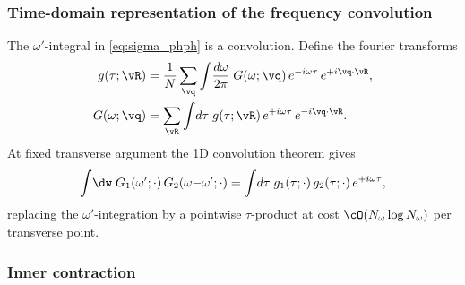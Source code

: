 \subsubsection{Time-domain representation of the frequency
  convolution}
\label{ssub:time_domain}

The $\omega'$-integral in \cref{eq:sigma_phph} is a convolution.
Define the fourier transforms
\begin{align}
  g(\tau;\vR) &= \frac{1}{N}\sum_{\vq}\int\!\frac{d\omega}{2\pi}\;
                  G(\omega;\vq)\,e^{-i\omega\tau}\,e^{+i\vq\cdot\vR},
  \label{eq:g_2d}\\
  G(\omega;\vq) &= \sum_{\vR}\int\!d\tau\;
                  g(\tau;\vR)\,e^{+i\omega\tau}\,e^{-i\vq\cdot\vR}.
  \label{eq:G_2d}
\end{align}
At fixed transverse argument the 1D convolution theorem gives
\begin{equation}
  \int\!\dw\; G_1(\omega';\cdot)\,G_2(\omega{-}\omega';\cdot)
  = \int\!d\tau\; g_1(\tau;\cdot)\,g_2(\tau;\cdot)\,
    e^{+i\omega\tau},
  \label{eq:omega_conv}
\end{equation}
replacing the $\omega'$-integration by a pointwise $\tau$-product
at cost $\cO(N_\omega\log N_\omega)$ per transverse point.

\subsubsection{Inner contraction}
\label{ssub:contraction}

